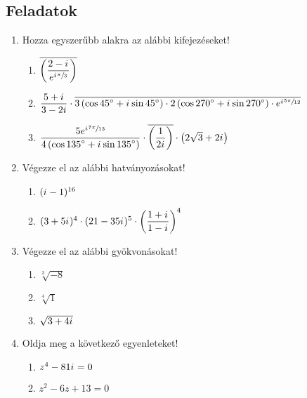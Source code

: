 \documentclass[a4paper, 12pt]{scrartcl}
\begin{document}
\clearpage
\subsection{Feladatok}

\begin{enumerate}
  \item Hozza egyszerűbb alakra az alábbi kifejezéseket!
        \begin{enumerate}
          \item $\overline{\left(\dfrac{
                      2 - {i\mkern1mu}
                    }{
                      e^{{i\mkern1mu} \sfrac{\pi}{3}}
                    }\right)}$
          \item $\dfrac{5 + \iu}{3 - 2i} \cdot \overline{
                    \rcisdeg*{3}{45} \cdot
                    \rcisdeg*{2}{270} \cdot
                    e^{\iu \sfrac{5\pi}{12}}
                  }$

          \item $\dfrac{
                    5 e^{\iu \sfrac{7\pi}{13}}
                  }{
                    \rcisdeg*{4}{135}
                  } \cdot \overline{\left(
                    \dfrac{1}{2\iu}
                    \right)} \cdot \left(
                  2 \sqrt{3} + 2 \iu
                  \right)
                $
        \end{enumerate}

  \item Végezze el az alábbi hatványozásokat!
        \begin{enumerate}
          \item $({i\mkern1mu} - 1)^{16}$
          \item $(3 + 5{i\mkern1mu})^4 \cdot
                  (21 - 35{i\mkern1mu})^5 \cdot
                  \left(\dfrac{1 + {i\mkern1mu}}{1 - {i\mkern1mu}}\right)^4$
        \end{enumerate}

  \item Végezze el az alábbi gyökvonásokat!
        \begin{enumerate}
          \item $\sqrt[3]{-8}$
          \item $\sqrt[4]{1}$
          \item $\sqrt{3 + 4{i\mkern1mu}}$
        \end{enumerate}

  \item Oldja meg a következő egyenleteket!
        \begin{enumerate}
          \item $z^4 - 81 {i\mkern1mu} = 0$
          \item $z^2 - 6z + 13 = 0$
        \end{enumerate}


\end{enumerate}
\end{document}

